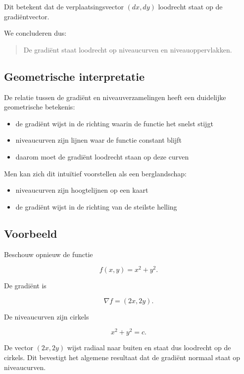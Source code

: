\documentclass[11pt,a4paper]{article}
\begin{document}
    Dit betekent dat de verplaatsingsvector $(dx,dy)$ loodrecht staat op
    de gradiëntvector.

    We concluderen dus:

    \begin{quote}
        De gradiënt staat loodrecht op niveaucurven en niveauoppervlakken.
    \end{quote}

    \subsection{Geometrische interpretatie}

    De relatie tussen de gradiënt en niveauverzamelingen heeft een duidelijke
    geometrische betekenis:

    \begin{itemize}
        \item de gradiënt wijst in de richting waarin de functie het snelst stijgt
        \item niveaucurven zijn lijnen waar de functie constant blijft
        \item daarom moet de gradiënt loodrecht staan op deze curven
    \end{itemize}

    Men kan zich dit intuïtief voorstellen als een berglandschap:

    \begin{itemize}
        \item niveaucurven zijn hoogtelijnen op een kaart
        \item de gradiënt wijst in de richting van de steilste helling
    \end{itemize}

    \subsection{Voorbeeld}

    Beschouw opnieuw de functie

    \[
        f(x,y) = x^2 + y^2.
    \]

    De gradiënt is

    \[
        \nabla f = (2x,2y).
    \]

    De niveaucurven zijn cirkels

    \[
        x^2 + y^2 = c.
    \]

    De vector $(2x,2y)$ wijst radiaal naar buiten en staat dus loodrecht
    op de cirkels. Dit bevestigt het algemene resultaat dat de gradiënt
    normaal staat op niveaucurven.
\end{document}

